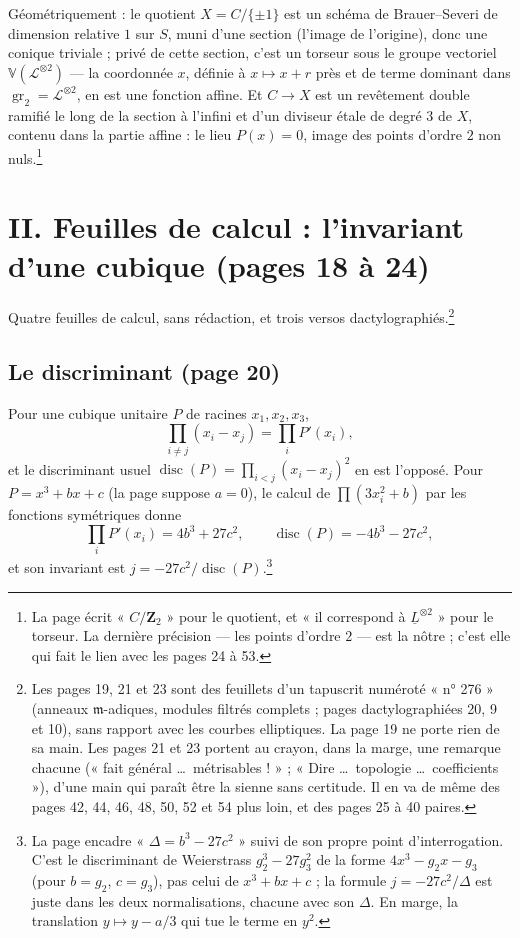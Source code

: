 \documentclass[11pt,a4paper]{article}
\begin{document}
Géométriquement : le quotient $X = C/\{\pm 1\}$ est un schéma de
Brauer--Severi de dimension relative $1$ sur $S$, muni d'une section (l'image de
l'origine), donc une conique triviale ; privé de cette section, c'est un
torseur sous le groupe vectoriel $\mathbb{V}(\mathcal{L}^{\otimes 2})$ --- la
coordonnée $x$, définie à $x \mapsto x + r$ près et de terme dominant dans
$\operatorname{gr}_2 = \mathcal{L}^{\otimes 2}$, en est une fonction affine.
Et $C \to X$ est un revêtement double ramifié le long de la section à l'infini
et d'un diviseur étale de degré $3$ de $X$, contenu dans la partie affine : le
lieu $P(x) = 0$, image des points d'ordre $2$ non nuls.\footnote{La page écrit
« $C/\mathbf{Z}_2$ » pour le quotient, et « il correspond à
$\underline{L}^{\otimes 2}$ » pour le torseur. La dernière précision --- les
points d'ordre $2$ --- est la nôtre ; c'est elle qui fait le lien avec les
pages 24 à 53.}

\section*{II. Feuilles de calcul : l'invariant d'une cubique (pages 18 à 24)}

Quatre feuilles de calcul, sans rédaction, et trois versos
dactylographiés.\footnote{Les pages 19, 21 et 23 sont des feuillets d'un
tapuscrit numéroté « n° 276 » (anneaux $\mathfrak{m}$-adiques, modules filtrés
complets ; pages dactylographiées 20, 9 et 10), sans rapport avec les courbes
elliptiques. La page 19 ne porte rien de sa main. Les pages 21 et 23 portent
au crayon, dans la marge, une remarque chacune (« fait général \ldots\
métrisables ! » ; « Dire \ldots\ topologie \ldots\ coefficients »), d'une main
qui paraît être la sienne sans certitude. Il en va de même des pages 42, 44,
46, 48, 50, 52 et 54 plus loin, et des pages 25 à 40 paires.}

\subsection*{Le discriminant (page 20)}

Pour une cubique unitaire $P$ de racines
$x_1, x_2, x_3$,
\[
\prod_{i \neq j}(x_i - x_j) = \prod_i P'(x_i),
\]
et le discriminant usuel $\operatorname{disc}(P) = \prod_{i<j}(x_i - x_j)^2$ en
est l'opposé. Pour $P = x^3 + bx + c$ (la page suppose $a = 0$), le calcul de
$\prod(3x_i^2 + b)$ par les fonctions symétriques donne
\[
\prod_i P'(x_i) = 4b^3 + 27c^2, \qquad \operatorname{disc}(P) = -4b^3 - 27c^2,
\]
et son invariant est $j = -27c^2/\operatorname{disc}(P)$.\footnote{La page
encadre « $\Delta = b^3 - 27c^2$ » suivi de son propre point d'interrogation.
C'est le discriminant de Weierstrass $g_2^3 - 27g_3^2$ de la forme $4x^3 - g_2x
- g_3$ (pour $b = g_2$, $c = g_3$), pas celui de $x^3 + bx + c$ ; la formule $j
= -27c^2/\Delta$ est juste dans les deux normalisations, chacune avec son
$\Delta$. En marge, la translation $y \mapsto y - a/3$ qui tue le terme en
$y^2$.}
\end{document}
